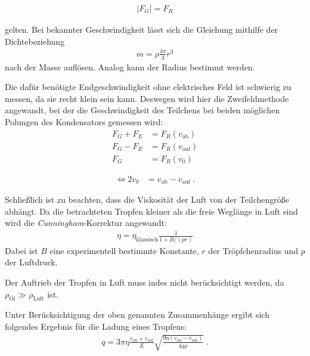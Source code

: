   \begin{align*}
    |F_G| = F_R
  \end{align*}

  gelten. Bei bekannter Geschwindigkeit lässt sich die Gleichung mithilfe der Dichtebeziehung
  \begin{align}\label{equ:dichte}
    m = \rho \frac{4 \pi}{3}r^3
  \end{align}
  nach der Masse auflösen. Analog kann der Radius bestimmt werden.

  Die dafür benötigte Endgeschwindigkeit ohne elektrisches Feld ist schwierig zu messen, da sie recht klein sein kann. Deswegen wird hier die Zweifeldmethode angewandt, bei der die Geschwindigkeit des Teilchens bei beiden möglichen Polungen des Kondensators gemessen wird:
  \begin{align*}
    F_G+F_E &= F_R(v_{\mathrm{ab}})\\
    F_G-F_E &= F_R(v_{\mathrm{auf}})\\
    F_G &= F_R(v_0)
  \end{align*}

  \begin{align}\label{equ:polung}
    \iff 2 v_0 &= v_{\mathrm{ab}} - v_{\mathrm{auf}} \;.
  \end{align}

  Schließlich ist zu beachten, dass die Viskosität der Luft von der Teilchengröße abhängt. Da die betrachteten Tropfen kleiner als die freie Weglänge in Luft sind wird die \emph{Cunningham}-Korrektur angewandt:
  \begin{align}\label{equ:cunning}
     \eta = \eta_{\text{klassisch}} \frac{1}{1+B/(pr)}
  \end{align}
   Dabei ist $B$ eine experimentell bestimmte Konstante, $r$ der Tröpfchenradius und $p$ der Luftdruck.

   Der Auftrieb der Tropfen in Luft muss indes nicht berücksichtigt werden, da $\rho_{\text{Öl}} \gg \rho_{\text{Luft}}$ ist.

   \par
   \par

   Unter Berücksichtigung der oben genannten Zusammenhänge ergibt sich folgendes Ergebnis für die Ladung eines Tropfens:
   \begin{align}\label{equ:ladung}
     q = 3 \pi \eta \frac{v_{\mathrm{ab}}+v_{\mathrm{auf}}}{E} \sqrt{\frac{9 \eta (v_{\mathrm{ab}}-v_{\mathrm{auf}})}{4 g \rho}} \;.
   \end{align}
